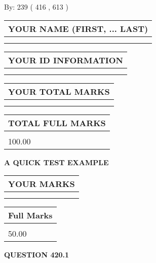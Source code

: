 \documentclass[12pt]{article}
\begin{document}
   
\hspace{1.0in} By: 
 239 ( 416 ,  613 )
   
   
   
   
\newpage 
\setcounter{page}{ 
   420001 } 
   
   
   
   
\noindent\begin{tabular}{|l|}
\hline
YOUR NAME (FIRST, ... LAST)  \\
\hline
 \\ 
 \\ 
\hline
\end{tabular}
\hspace{0.05in} \begin{tabular}{|l|}
\hline
 YOUR   ID   INFORMATION  \\
\hline
 \\ 
 \\ 
\hline
\end{tabular}
   
   
\vspace{0.2in}\noindent\begin{tabular}{|l|}
\hline
YOUR TOTAL MARKS  \\
\hline
 \\ 
 \\ 
\hline
\end{tabular}
\hspace{0.05in} \begin{tabular}{|l|}
\hline
TOTAL FULL MARKS  \\
\hline
 \\ 
100.00 \\
\hline
\end{tabular}
   
   
 \vspace{0.2in}
{\LARGE {\textbf{ A QUICK TEST EXAMPLE}}}
   
   
  
\vspace{0.2in}
  
\noindent\begin{tabular}{|l|}
\hline
 YOUR MARKS  \\
\hline
 \\ 
 \\ 
\hline
\end{tabular}
\hspace{0.05in} \begin{tabular}{|l|}
\hline
 Full Marks  \\
\hline
 \\ 
50.00 \\
\hline
\end{tabular}
{\textbf{\Large{QUESTION
420.1 
}}}
  
\end{document}
